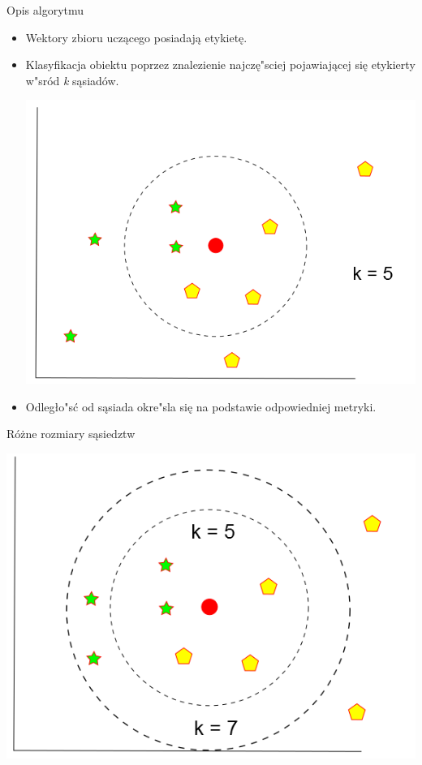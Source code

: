\begin{frame}{Opis algorytmu}
\begin{itemize}
	\item Wektory zbioru uczącego posiadają etykietę.
	\item Klasyfikacja obiektu poprzez znalezienie najczę"sciej pojawiającej się etykierty w"sród \emph{k} sąsiadów.
	\begin{center}
		\includegraphics[keepaspectratio=true, scale=0.3]{neigh_small}
	\end{center}
	\item Odległo"sć od sąsiada okre"sla się na podstawie odpowiedniej metryki.
\end{itemize}
\end{frame}

\begin{frame}{Różne rozmiary sąsiedztw}
\begin{center}
	\includegraphics[keepaspectratio=true, scale=0.55]{neigh_k_small}
\end{center}
\end{frame}

